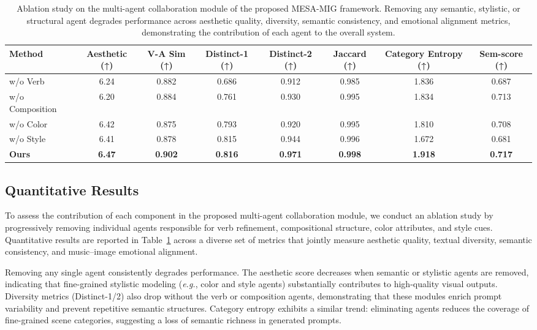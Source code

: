 \documentclass[letterpaper]{article}
\begin{document}
\begin{table}[t]
\centering
\begin{small}
\begin{tabular}{lccccccc}
\toprule
\textbf{Method} 
& \textbf{Aesthetic (↑)}
& \textbf{V-A Sim (↑)} 
& \textbf{Distinct-1 (↑)} 
& \textbf{Distinct-2 (↑)} 
& \textbf{Jaccard (↑)} 
& \textbf{Category Entropy (↑)} 
& \textbf{Sem-score (↑)} \\
\midrule
w/o Verb        & 6.24 & 0.882 & 0.686 & 0.912 & 0.985 & 1.836 & 0.687 \\
w/o Composition & 6.20 & 0.884 & 0.761 & 0.930 & 0.995 & 1.834 & 0.713 \\
w/o Color       & 6.42 & 0.875 & 0.793 & 0.920 & 0.995 & 1.810 & 0.708 \\
w/o Style       & 6.41 & 0.878 & 0.815 & 0.944 & 0.996 & 1.672 & 0.681 \\
\textbf{Ours}   & \textbf{6.47} & \textbf{0.902} & \textbf{0.816} & \textbf{0.971} & \textbf{0.998} & \textbf{1.918} & \textbf{0.717} \\
\bottomrule
\end{tabular}
\caption{Ablation study on the multi-agent collaboration module of the proposed MESA-MIG framework. Removing any semantic, stylistic, or structural agent degrades performance across aesthetic quality, diversity, semantic consistency, and emotional alignment metrics, demonstrating the contribution of each agent to the overall system.}
\label{tab:ablation}
\end{small}
\end{table}

\subsection{Quantitative Results}
To assess the contribution of each component in the proposed multi-agent collaboration module, we conduct an ablation study by progressively removing individual agents responsible for verb refinement, compositional structure, color attributes, and style cues. Quantitative results are reported in Table~\ref{tab:ablation} across a diverse set of metrics that jointly measure aesthetic quality, textual diversity, semantic consistency, and music--image emotional alignment.

Removing any single agent consistently degrades performance.  
The aesthetic score decreases when semantic or stylistic agents are removed, indicating that fine-grained stylistic modeling (\emph{e.g.}, color and style agents) substantially contributes to high-quality visual outputs.  
Diversity metrics (Distinct-1/2) also drop without the verb or composition agents, demonstrating that these modules enrich prompt variability and prevent repetitive semantic structures.  
Category entropy exhibits a similar trend: eliminating agents reduces the coverage of fine-grained scene categories, suggesting a loss of semantic richness in generated prompts.
\end{document}
